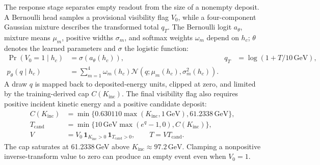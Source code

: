 \documentclass[11pt]{article}
\newcommand{\GeV}{\,\mathrm{GeV}}
\newcommand{\Kinc}{K_{\mathrm{inc}}}
\begin{document}
The response stage separates empty readout from the size of a nonempty deposit. A Bernoulli head samples a provisional visibility flag $V_0$, while a four-component Gaussian mixture describes the transformed total $q_T$. The Bernoulli logit $a_\theta$, mixture means $\mu_m$, positive widths $\sigma_m$, and softmax weights $\omega_m$ depend on $h_c$; $\theta$ denotes the learned parameters and $\sigma$ the logistic function:
\begin{equation}
 \begin{aligned}
 \Pr(V_0=1\mid h_c)&=\sigma(a_\theta(h_c)),
 &q_T&=\log(1+T/10\GeV),\\
 p_\theta(q\mid h_c)&=\sum_{m=1}^{4}\omega_m(h_c)
 \mathcal N\!\left(q;\mu_m(h_c),\sigma_m^2(h_c)\right).
 \end{aligned}
 \label{eq:response_transform}
\end{equation}
A draw $q$ is mapped back to deposited-energy units, clipped at zero, and limited by the training-derived cap $C(\Kinc)$. The final visibility flag also requires positive incident kinetic energy and a positive candidate deposit:
\begin{equation}
 \begin{aligned}
 C(\Kinc)&=\min\{0.630110\max(\Kinc,1\GeV),61.2338\GeV\},\\
 T_{\mathrm{cand}}&=\min\{10\GeV\max(e^q-1,0),C(\Kinc)\},\\
 V&=V_0\,\mathbf 1_{\Kinc>0}\,\mathbf 1_{T_{\mathrm{cand}}>0},
 \qquad T=VT_{\mathrm{cand}}.
 \end{aligned}
 \label{eq:cap}
\end{equation}
The cap saturates at 61.2338\,GeV above $\Kinc\approx97.2\GeV$. Clamping a nonpositive inverse-transform value to zero can produce an empty event even when $V_0=1$.
\end{document}
